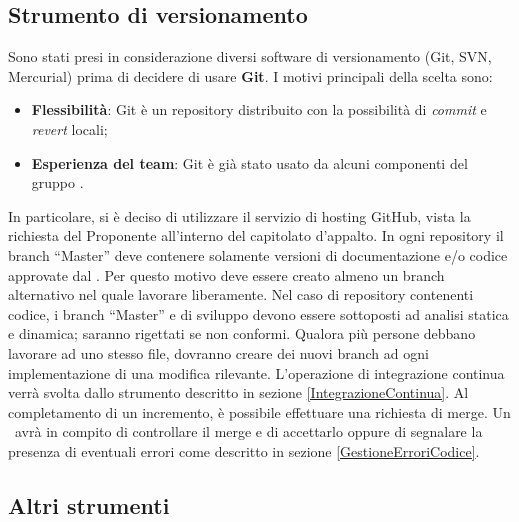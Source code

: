 \documentclass[../NormeDiProgetto.tex]{subfiles}
\begin{document}
		\subsection{Strumento di versionamento}\label{StrumentoDiVersionamento}
			Sono stati presi in considerazione diversi software di versionamento (Git, SVN, Mercurial)
			prima di decidere di usare \textbf{Git}. I motivi principali della scelta sono: 
			\begin{itemize}
				\item \textbf{Flessibilità}: Git è un repository distribuito con la possibilità di
				\textit{commit} e \textit{revert} locali;
				\item \textbf{Esperienza del team}: Git è già stato usato da alcuni componenti
				del gruppo \kaleidoscode.
			\end{itemize}
			In particolare, si è deciso di utilizzare il servizio di hosting GitHub, vista la richiesta
			del Proponente all'interno del capitolato d'appalto.
			In ogni repository il branch ``Master'' deve contenere solamente versioni di documentazione e/o
			codice approvate dal \responsabilediprogetto. Per questo motivo deve essere creato almeno un
			branch alternativo nel quale lavorare liberamente.
			Nel caso di repository contenenti codice, i branch ``Master'' e di sviluppo devono essere
			sottoposti ad analisi statica e dinamica; saranno rigettati se non conformi.
			Qualora più persone debbano lavorare ad uno stesso file, dovranno creare dei nuovi branch ad ogni
			implementazione di una modifica rilevante.
			L'operazione di integrazione continua verrà svolta dallo strumento descritto in sezione
			\ref{IntegrazioneContinua}.
			Al completamento di un incremento, è possibile effettuare una richiesta di merge.
			Un \verificatore\ avrà in compito di controllare il merge e di accettarlo oppure di segnalare
			la presenza di eventuali errori come descritto in sezione \ref{GestioneErroriCodice}.
		\subsection{Altri strumenti}
\end{document}
